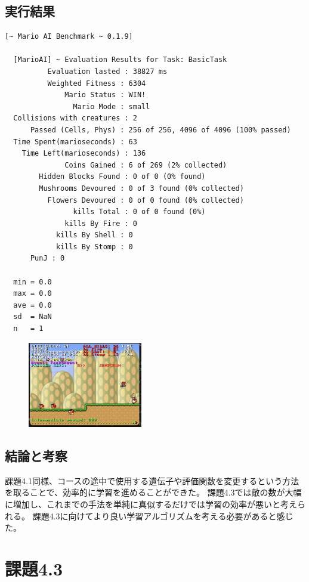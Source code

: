 \documentclass[a4paper,11pt]{jsarticle}
\begin{document}
{\subsection*{実行結果}

\begin{lstlisting}[caption=実行結果]
  [~ Mario AI Benchmark ~ 0.1.9]

  [MarioAI] ~ Evaluation Results for Task: BasicTask
          Evaluation lasted : 38827 ms
          Weighted Fitness : 6304
              Mario Status : WIN!
                Mario Mode : small
  Collisions with creatures : 2
      Passed (Cells, Phys) : 256 of 256, 4096 of 4096 (100% passed)
  Time Spent(marioseconds) : 63
    Time Left(marioseconds) : 136
              Coins Gained : 6 of 269 (2% collected)
        Hidden Blocks Found : 0 of 0 (0% found)
        Mushrooms Devoured : 0 of 3 found (0% collected)
          Flowers Devoured : 0 of 0 found (0% collected)
                kills Total : 0 of 0 found (0%)
              kills By Fire : 0
            kills By Shell : 0
            kills By Stomp : 0
      PunJ : 0

  min = 0.0
  max = 0.0
  ave = 0.0
  sd  = NaN
  n   = 1
\end{lstlisting}

\begin{figure}
  \begin{center}
    \includegraphics*[width=50mm]{images/report3/reaching-goal.png}
  \end{center}
\end{figure}

\subsection*{結論と考察}
課題4.1同様、コースの途中で使用する遺伝子や評価関数を変更するという方法を取ることで、効率的に学習を進めることができた。
課題4.3では敵の数が大幅に増加し、これまでの手法を単純に真似するだけでは学習の効率が悪いと考えられる。
課題4.3に向けてより良い学習アルゴリズムを考える必要があると感じた。

\section*{課題4.3}

}
\end{document}
